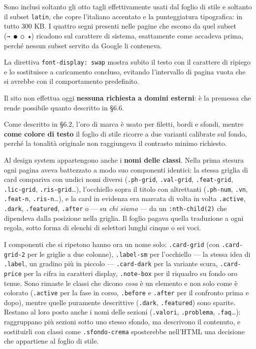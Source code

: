 \documentclass[
  11pt,
]{article}
\begin{document}
Sono inclusi soltanto gli otto tagli effettivamente usati dal foglio di
stile e soltanto il subset \texttt{latin}, che copre l'italiano
accentato e la punteggiatura tipografica: in tutto 300 KB. I quattro
segni presenti nelle pagine che escono da quel subset
(\texttt{→\ ●\ ○\ ★}) ricadono sul carattere di sistema, esattamente
come accadeva prima, perché nessun subset servito da Google li
conteneva.

La direttiva \texttt{font-display:\ swap} mostra subito il testo con il
carattere di ripiego e lo sostituisce a caricamento concluso, evitando
l'intervallo di pagina vuota che si avrebbe con il comportamento
predefinito.

Il sito non effettua oggi \textbf{nessuna richiesta a domini esterni}: è
la premessa che rende possibile quanto descritto in §6.6.

Come descritto in §6.2, l'oro di marca è usato per filetti, bordi e
sfondi, mentre \textbf{come colore di testo} il foglio di stile ricorre
a due varianti calibrate sul fondo, perché la tonalità originale non
raggiungeva il contrasto minimo richiesto.

Al design system appartengono anche i \textbf{nomi delle classi}. Nella
prima stesura ogni pagina aveva battezzato a modo suo componenti
identici: la stessa griglia di card compariva con undici nomi diversi
(\texttt{.ph-grid}, \texttt{.val-grid}, \texttt{.feat-grid},
\texttt{.lic-grid}, \texttt{.ris-grid}\ldots), l'occhiello sopra il
titolo con altrettanti (\texttt{.ph-num}, \texttt{.vn},
\texttt{.feat-n}, \texttt{.ris-n}\ldots), e la card in evidenza era
marcata di volta in volta \texttt{.active}, \texttt{.dark},
\texttt{.featured}, \texttt{.after} o --- su \emph{chi siamo} --- da un
\texttt{:nth-child(2)} che dipendeva dalla posizione nella griglia. Il
foglio pagava quella traduzione a ogni regola, sotto forma di elenchi di
selettori lunghi cinque o sei voci.

I componenti che si ripetono hanno ora un nome solo: \texttt{.card-grid}
(con \texttt{.card-grid-2} per le griglie a due colonne),
\texttt{.label-sm} per l'occhiello --- la stessa idea di
\texttt{.label}, un gradino più in piccolo --- \texttt{.card-dark} per
la variante scura, \texttt{.card-price} per la cifra in caratteri
display, \texttt{.note-box} per il riquadro su fondo oro tenue. Sono
rimaste le classi che dicono \emph{cosa} è un elemento e non solo come è
colorato (\texttt{.active} per la fase in corso, \texttt{.before} e
\texttt{.after} per il confronto prima e dopo), mentre quelle puramente
descrittive (\texttt{.dark}, \texttt{.featured}) sono sparite. Restano
al loro posto anche i nomi delle sezioni (\texttt{.valori},
\texttt{.problema}, \texttt{.faq}\ldots): raggruppano più sezioni sotto
uno stesso sfondo, ma descrivono il contenuto, e sostituirli con classi
come \texttt{.sfondo-crema} sposterebbe nell'HTML una decisione che
appartiene al foglio di stile.
\end{document}
